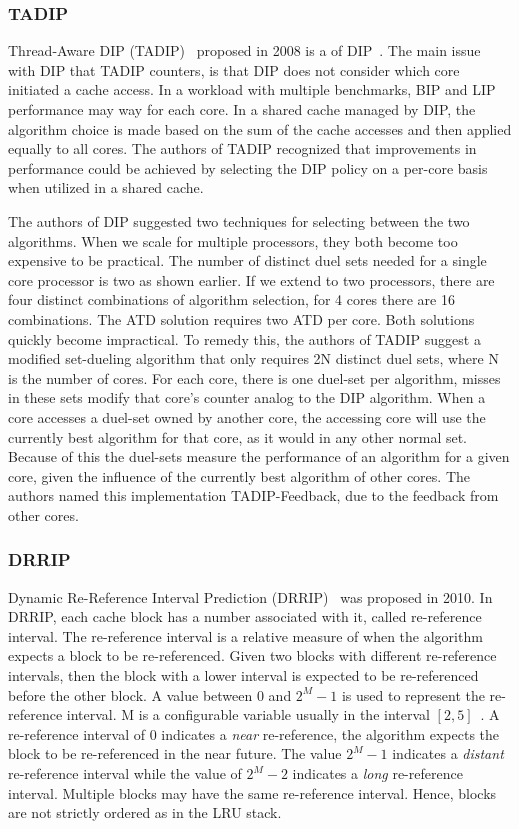 \subsubsection{TADIP}
Thread-Aware DIP (TADIP)~\cite{Jaleel2008} proposed in 2008 is a of DIP~\cite{Qureshi2007}.
The main issue with DIP that TADIP counters, is that DIP does not consider which core initiated a cache access.
In a workload with multiple benchmarks, BIP and LIP performance may way for each core.
In a shared cache managed by DIP, the algorithm choice is made based on the sum of the cache accesses and then applied equally to all cores.
The authors of TADIP recognized that improvements in performance could be achieved by selecting the DIP policy on a per-core basis when utilized in a shared cache.

The authors of DIP suggested two techniques for selecting between the two algorithms. 
When we scale for multiple processors, they both become too expensive to be practical.
The number of distinct duel sets needed for a single core processor is two as shown earlier.
If we extend to two processors, there are four distinct combinations of algorithm selection, for 4 cores there are 16 combinations.
The ATD solution requires two ATD per core.
Both solutions quickly become impractical.
To remedy this, the authors of TADIP suggest a modified set-dueling algorithm that only requires 2N distinct duel sets, where N is the number of cores.
For each core, there is one duel-set per algorithm, misses in these sets modify that core's counter analog to the DIP algorithm.
When a core accesses a duel-set owned by another core, the accessing core will use the currently best algorithm for that core, as it would in any other normal set.
Because of this the duel-sets measure the performance of an algorithm for a given core, given the influence of the currently best algorithm of other cores.
The authors named this implementation TADIP-Feedback, due to the feedback from other cores.

\subsubsection{DRRIP}

Dynamic Re-Reference Interval Prediction (DRRIP)~\cite{Jaleel2010} was proposed in 2010.
In DRRIP, each cache block has a number associated with it, called re-reference interval.
The re-reference interval is a relative measure of when the algorithm expects a block to be re-referenced.
Given two blocks with different re-reference intervals, then the block with a lower interval is expected to be re-referenced before the other block.
A value between 0 and $2^M - 1$ is used to represent the re-reference interval.
M is a configurable variable usually in the interval $[2, 5]$~\cite{Jaleel2010}.
A re-reference interval of 0 indicates a \textit{near} re-reference, the algorithm expects the block to be re-referenced in the near future.
The value $2^M - 1$ indicates a \textit{distant} re-reference interval while the value of $2^M - 2$ indicates a \textit{long} re-reference interval.
Multiple blocks may have the same re-reference interval. 
Hence, blocks are not strictly ordered as in the LRU stack.

